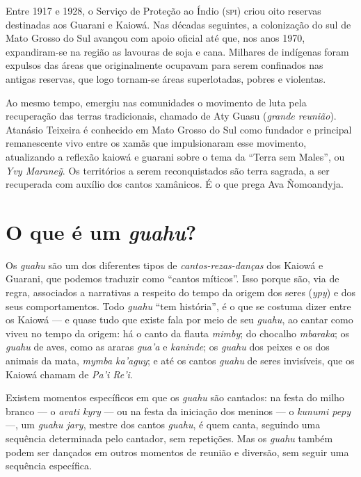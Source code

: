 Entre 1917 e 1928, o Serviço de Proteção ao Índio (\textsc{spi}) criou oito
reservas destinadas aos Guarani e Kaiowá. Nas décadas seguintes, a
colonização do sul de Mato Grosso do Sul avançou com apoio oficial até
que, nos anos 1970, expandiram-se na região as lavouras de soja e cana.
Milhares de indígenas foram expulsos das áreas que originalmente ocupavam
para serem confinados nas antigas reservas, que logo tornam-se áreas
superlotadas, pobres e violentas.

Ao mesmo tempo, emergiu nas comunidades o movimento de luta pela
recuperação das terras tradicionais, chamado de Aty Guasu (\textit{grande
reunião}). Atanásio Teixeira é conhecido em Mato Grosso do Sul como
fundador e principal remanescente vivo entre os xamãs que impulsionaram
esse movimento, atualizando a reflexão kaiowá e guarani sobre o tema da
``Terra sem Males'', ou \textit{Yvy Maraneỹ}. Os territórios a serem
reconquistados são terra sagrada, a ser recuperada com auxílio dos
cantos xamânicos. É o que prega Ava Ñomoandyja.

\section{O que é um \textit{guahu}?}

Os \textit{guahu} são um dos diferentes tipos de \textit{cantos-rezas-danças} dos
Kaiowá e Guarani, que podemos traduzir como ``cantos míticos''. Isso porque são, via de regra, associados a
narrativas a respeito do tempo da origem dos seres (\textit{ypy}) e dos
seus comportamentos. Todo \textit{guahu} ``tem história'', é o que se
costuma dizer entre os Kaiowá --- e quase tudo que existe fala por meio de
seu \textit{guahu}, ao cantar como viveu no tempo da origem: há o canto da
flauta \textit{mimby}; do chocalho \textit{mbaraka}; os \textit{guahu} de
aves, como as araras \textit{gua'a} e \textit{kaninde}; os \textit{guahu} dos
peixes e os dos animais da mata, \textit{mymba ka'aguy}; e até os cantos
\textit{guahu} de seres invisíveis, que os Kaiowá chamam de \textit{Pa'i
Re'i}.

Existem momentos específicos em que os \textit{guahu} são cantados: na
festa do milho branco --- o \textit{avati kyry} --- ou na festa da iniciação
dos meninos --- o \textit{kunumi pepy} ---, um \textit{guahu jary}, mestre dos
cantos \textit{guahu}, é quem canta, seguindo uma sequência determinada
pelo cantador, sem repetições. Mas os \textit{guahu} também podem ser
dançados em outros momentos de reunião e diversão, sem seguir uma
sequência específica.

